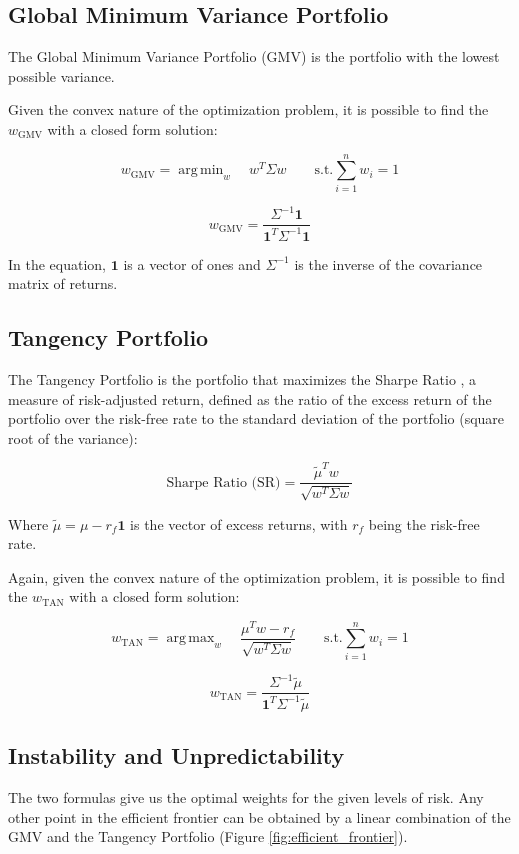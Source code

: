 \documentclass{article}
\DeclareMathOperator*{\argmin}{arg\,min}
\DeclareMathOperator*{\argmax}{arg\,max}
\begin{document}
\FloatBarrier
\subsection{Global Minimum Variance Portfolio}
The Global Minimum Variance Portfolio (GMV) is the portfolio with the lowest possible variance.

Given the convex nature of the optimization problem, it is possible to find the $w_{\text{GMV}}$ with a closed form solution:

$$
{w}_{\text{GMV}} = \argmin_{w} \quad w^{T} \Sigma w \quad \quad
\text{s.t.} \sum_{i=1}^{n} w_{i} = 1
$$

$$
{w}_{\text{GMV}} = \frac{\Sigma^{-1} \mathbf{1}}{\mathbf{1}^{T} \Sigma^{-1} \mathbf{1}}
$$

In the equation, $\mathbf{1}$ is a vector of ones and $\Sigma^{-1}$ is the inverse of the covariance matrix of returns.

\FloatBarrier
\subsection{Tangency Portfolio}
The Tangency Portfolio is the portfolio that maximizes the Sharpe Ratio \cite{sharpe1964capital}, a measure of risk-adjusted return, defined as the ratio of the excess return of the portfolio over the risk-free rate to the standard deviation of the portfolio (square root of the variance):

$$
\text{Sharpe Ratio (SR)} = \frac{\tilde{\mu}^{T} w}{\sqrt{w^{T} \Sigma w}}
$$

Where $\tilde{\mu} = \mu - r_f \mathbf{1}$ is the vector of excess returns, with $r_f$ being the risk-free rate.

Again, given the convex nature of the optimization problem, it is possible to find the $w_{\text{TAN}}$ with a closed form solution:

$$
w_{\text{TAN}} = \argmax_{w} \quad \frac{\mu^{T} w - r_f}{\sqrt{w^{T} \Sigma w}} \quad \quad
\text{s.t.} \sum_{i=1}^{n} w_{i} = 1
$$

$$
w_{\text{TAN}} = \frac{\Sigma^{-1} \tilde{\mu}}{\mathbf{1}^{T} \Sigma^{-1} \tilde{\mu}}
$$

\FloatBarrier
\subsection{Instability and Unpredictability}
The two formulas give us the optimal weights for the given levels of risk. Any other point in the efficient frontier can be obtained by a linear combination of the GMV and the Tangency Portfolio (Figure \ref{fig:efficient_frontier}).
\end{document}
